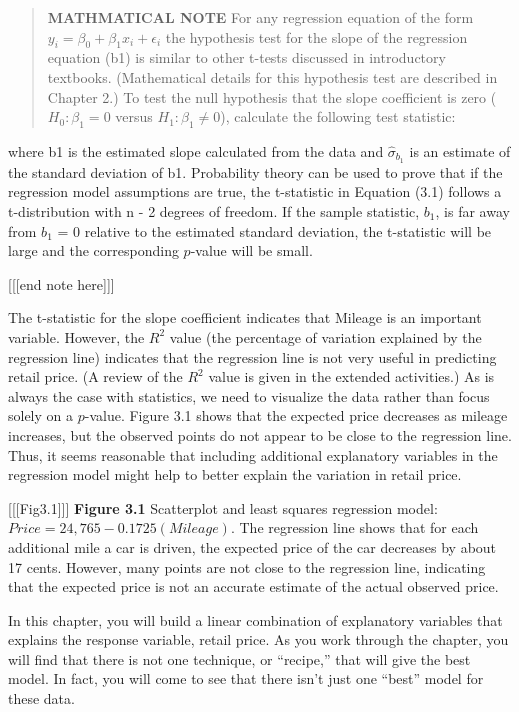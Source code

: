 \documentclass[
]{report}
\theoremstyle{definition}
\theoremstyle{definition}
\theoremstyle{definition}
\theoremstyle{definition}
\theoremstyle{remark}
\begin{document}
\begin{quote}
\textbf{MATHMATICAL NOTE} For any regression equation of the form \(y_i = \beta_0 + \beta_1x_i + \epsilon_i\) the hypothesis test for the slope of the regression equation (b1) is similar to other t-tests discussed in introductory textbooks. (Mathematical details for this hypothesis test are described in Chapter 2.) To test the null hypothesis that the slope coefficient is zero (\(H_0 : \beta_1 = 0\) versus \(H_1 : \beta_1 \ne 0\)), calculate the following test statistic:
\end{quote}

where b1 is the estimated slope calculated from the data and \(\hat{\sigma}_{b_1}\) is an estimate of the standard deviation of b1. Probability theory can be used to prove that if the regression model assumptions are true, the t-statistic in Equation (3.1) follows a t-distribution with n - 2 degrees of freedom. If the sample statistic, \(b_1\), is far away from \(b_1\) = 0 relative to the estimated standard deviation, the t-statistic will be large and the corresponding \(p\)-value will be small.

{[}{[}{[}end note here{]}{]}{]}

The t-statistic for the slope coefficient indicates that Mileage is an important variable. However, the \(R^2\) value (the percentage of variation explained by the regression line) indicates that the regression line is not very useful in predicting retail price. (A review of the \(R^2\) value is given in the extended activities.) As is always the case with statistics, we need to visualize the data rather than focus solely on a \(p\)-value. Figure 3.1 shows that the expected price decreases as mileage increases, but the observed points do not appear to be close to the regression line. Thus, it seems reasonable that including additional explanatory variables in the regression model might help to better explain the variation in retail price.

{[}{[}{[}Fig3.1{]}{]}{]}
\textbf{Figure 3.1} Scatterplot and least squares regression model: \(Price = 24,765 - 0.1725(Mileage)\). The regression line shows that for each additional mile a car is driven, the expected price of the car decreases by about 17 cents. However, many points are not close to the regression line, indicating that the expected price is not an accurate estimate of the actual observed price.

In this chapter, you will build a linear combination of explanatory variables that explains the response variable, retail price. As you work through the chapter, you will find that there is not one technique, or ``recipe,'' that will give the best model. In fact, you will come to see that there isn't just one ``best'' model for these data.
\end{document}
